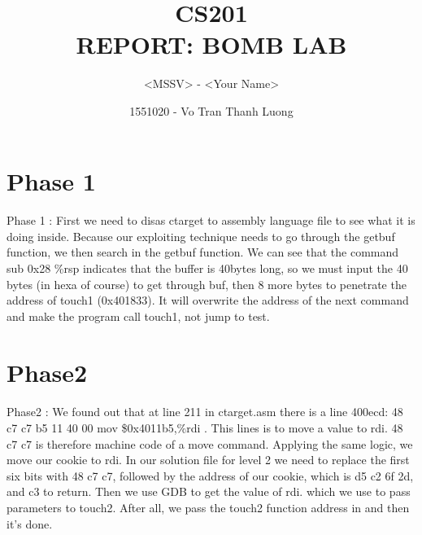 \documentclass[a4paper]{article}
\begin{document}
\title{CS201\\REPORT: BOMB LAB}

\author{<MSSV> - <Your Name>}
\author{1551020 - Vo Tran Thanh Luong}
\maketitle


\setcounter{page}{1}
\tableofcontents
{}

\clearpage



\section{Phase 1}
\paragraph{}  
Phase 1 : 
First we need to disas ctarget to assembly language file  to see what it is doing inside. Because our exploiting technique needs to go through the getbuf function, we then search in the getbuf function. We can see that the command sub 0x28 \%rsp indicates that the buffer is 40bytes long, so we must input the 40 bytes (in hexa of course) to get through buf, then 8 more bytes to penetrate the address of touch1 (0x401833). It will overwrite the address of the next command and make the program call touch1, not jump to test.



\section{Phase2}

\paragraph{}
Phase2 :
We found out that at line 211 in ctarget.asm there is a line  400ecd:	48 c7 c7 b5 11 40 00 	mov    \$0x4011b5,\%rdi . This lines is to move a value to rdi. 48 c7 c7 is therefore machine code of a move command. Applying the same logic, we move our cookie to rdi. In our solution file for level 2 we need to replace the first six bits with 48 c7 c7, followed by the address of our cookie, which is d5 c2 6f 2d, and c3 to return. Then we use GDB to get the value of rdi. which we use to pass parameters to touch2. After all, we pass the touch2 function address in and then it's done. 
\end{document}
